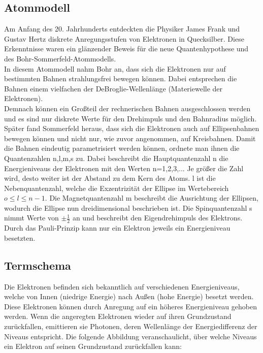 \documentclass{article}
\begin{document}
{\subsection{Atommodell}
Am Anfang des 20. Jahrhunderts entdeckten die Physiker James Frank und Gustav Hertz diskrete Anregungsstufen  von Elektronen in Quecksilber. Diese Erkenntnisse waren ein glänzender Beweis für die neue Quantenhypothese und des Bohr-Sommerfeld-Atommodells.\\
In diesem Atommodell nahm Bohr an, dass sich die Elektronen nur auf bestimmten Bahnen strahlungsfrei bewegen können. Dabei entsprechen die Bahnen einem vielfachen der DeBroglie-Wellenlänge (Materiewelle der Elektronen).\\
Demnach können ein Großteil der rechnerischen Bahnen ausgeschlossen werden und es sind nur diskrete Werte für den Drehimpuls und den Bahnradius möglich. Später fand Sommerfeld heraus, dass sich die Elektronen auch auf Ellipsenbahnen bewegen können und nicht nur, wie zuvor angenommen, auf Kreisbahnen. Damit die Bahnen eindeutig parametrisiert werden können, ordnete man ihnen die Quantenzahlen n,l,m,s zu. Dabei beschreibt die Hauptquantenzahl n die Energieniveaus der Elektronen mit den Werten n=1,2,3,... Je größer die Zahl wird, desto weiter ist der Abstand zu dem Kern des Atoms. l ist die Nebenquantenzahl, welche die Exzentrizität der Ellipse im Wertebereich \(o\leq l\leq n-1\). Die Magnetquantenzahl m beschreibt die Ausrichtung der Ellipsen, wodurch die Ellipse nun dreidimensional beschrieben ist. Die Spinquantenzahl s nimmt Werte von \(\pm\frac{1}{2}\) an und beschreibt den Eigendrehimpuls des Elektrons. Durch das Pauli-Prinzip kann nur ein Elektron jeweils ein Energieniveau besetzten.

\subsection{Termschema}
Die Elektronen befinden sich bekanntlich auf verschiedenen Energieniveaus, welche von Innen (niedrige Energie) nach Außen (hohe Energie) besetzt werden. Diese Elektronen können durch Anregung auf ein höheres Energieniveau gehoben werden. Wenn die angeregten Elektronen wieder auf ihren Grundzustand zurückfallen, emittieren sie Photonen, deren Wellenlänge der Energiedifferenz der Niveaus entspricht. Die folgende Abbildung veranschaulicht, über welche Niveaus ein Elektron auf seinen Grundzustand zurückfallen kann:

}
\end{document}
